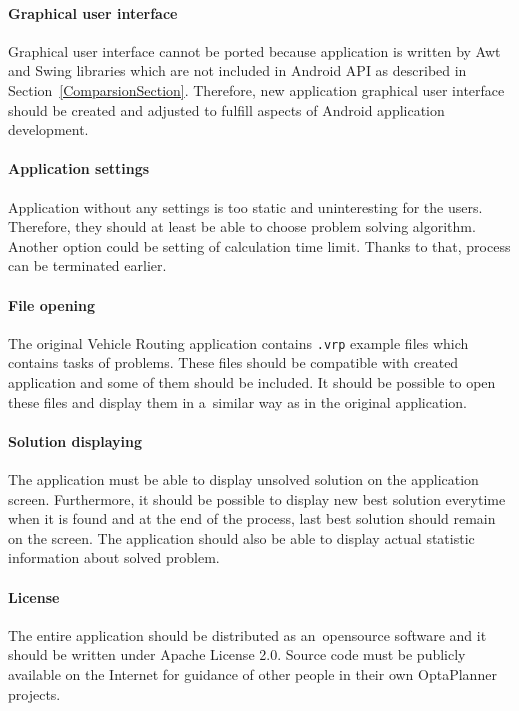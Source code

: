 \paragraph{Graphical user interface}
Graphical user interface cannot be ported because application is written by Awt and Swing libraries which are not
included in Android API as described in Section~\ref{ComparsionSection}. Therefore, new application graphical user
interface should be created and adjusted to fulfill aspects of Android application development.

\paragraph{Application settings}
Application without any settings is too static and uninteresting for the users. Therefore, they should at least be able
to choose problem solving algorithm. Another option could be setting of calculation time limit. Thanks to that, process
can be terminated earlier.

\paragraph{File opening}
The original Vehicle Routing application contains \texttt{.vrp} example files which contains tasks of problems. These
files should be compatible with created application and some of them should be included. It should be possible to open
these files and display them in a~similar way as in the original application.

\paragraph{Solution displaying}
The application must be able to display unsolved solution on the application screen. Furthermore, it should be possible
to display new best solution everytime when it is found and at the end of the process, last best solution should remain
on the screen. The application should also be able to display actual statistic information about solved problem.

\paragraph{License}
The entire application should be distributed as an~opensource software and it should be written under Apache License
2.0. Source code must be publicly available on the Internet for guidance of other people in their own OptaPlanner
projects.

